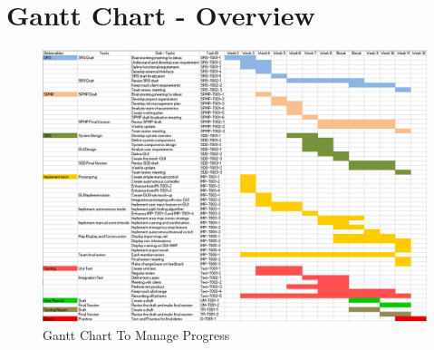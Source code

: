 \appendix
\section{Gantt Chart - Overview}
\begin{figure}[H]
	\centering
	\hspace*{-1.3in}
	\includegraphics[width=1.5\linewidth]{gantt-chart.PNG}  %
	\caption{Gantt Chart To Manage Progress}
	\label{gantt-chart-overview}
\end{figure}

%
